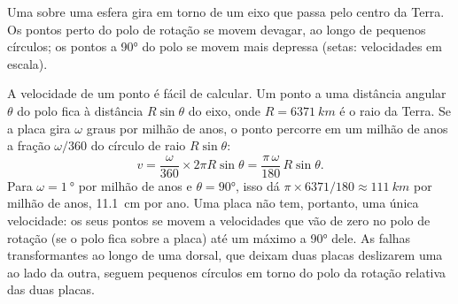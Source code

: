 \begin{omfigure}

{\small Uma  sobre uma esfera gira em torno de um eixo que passa
pelo centro da Terra. Os pontos perto do polo de rotação se movem devagar,
ao longo de pequenos círculos; os pontos a \ang{90} do polo se movem mais
depressa (setas: velocidades em escala).}
\end{omfigure}

A velocidade de um ponto é fácil de calcular. Um ponto a uma distância
angular $\theta$ do polo fica à distância $R\sin\theta$ do eixo, onde
$R = \qty{6371}{km}$ é o raio da Terra. Se a placa gira $\omega$
graus por milhão de anos, o ponto percorre em um milhão de anos a fração
$\omega/360$ do círculo de raio $R\sin\theta$:
\[
  v = \frac{\omega}{360} \times 2\pi R\sin\theta
    = \frac{\pi\,\omega}{180}\,R\sin\theta .
\]
Para $\omega = \qty{1}{\degree}$ por milhão de anos e $\theta = \ang{90}$,
isso dá $\pi \times 6371/180 \approx \qty{111}{km}$ por milhão de anos,
\qty{11.1}{cm} por ano. Uma placa não tem, portanto, uma única velocidade:
os seus pontos se movem a velocidades que vão de zero no polo de rotação (se
o polo fica sobre a placa) até um máximo a \ang{90} dele. As falhas
transformantes ao longo de uma dorsal, que deixam duas placas deslizarem uma
ao lado da outra, seguem pequenos círculos em torno do polo da rotação
relativa das duas placas.

